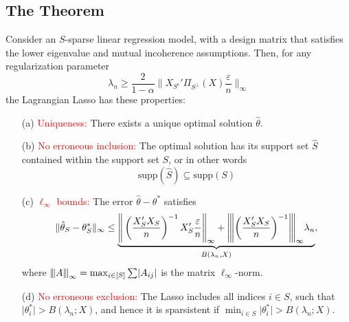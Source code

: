 \documentclass[10pt,handout,english]{beamer}
\newcommand{\vertiii}[1]{{\left\vert\kern-0.25ex\left\vert\kern-0.25ex\left\vert #1 
    \right\vert\kern-0.25ex\right\vert\kern-0.25ex\right\vert}}
\begin{document}
\subsection{The Theorem}

\begin{frame}[allowframebreaks]
\begin{theorem}[Part I]
Consider an $S$-sparse linear regression model, with a design matrix that satisfies the lower eigenvalue and mutual incoherence assumptions. Then, for any regularization parameter\justifying
\[
\lambda_n\geq\frac{2}{1-\alpha}\Bigg\lVert X_{S^c}'\Pi_{S^{\perp}}(X)\frac{\varepsilon}{n}\Bigg\rVert_{\infty}
\]
the Lagrangian Lasso has these properties:
\begin{itemize}
\item[(a)] \textcolor{red}{Uniqueness:} There exists a unique optimal solution $\hat{\theta}$.\justifying
\item[(b)] \textcolor{red}{No erroneous inclusion:} The optimal solution has its support set $\hat{S}$ contained within the support set $S$, or in other words\justifying
\[
\text{supp}(\hat{S})\subseteq \text{supp}(S) 
\]
\end{itemize}
\end{theorem}
\end{frame}


\begin{frame}

\begin{theorem}[Part II]
\begin{itemize}
\item[(c)] \textcolor{red}{$\ell_{\infty}$ bounds:} The error $\hat{\theta}-\theta^*$ satisfies
\[
\lVert\hat{\theta}_S-\theta_S^*\rVert_{\infty}\leq\underbrace{\Bigg\lVert\left(\frac{X_S'X_S}{n}\right)^{-1}X_S'\frac{\varepsilon}{n}\Bigg\rVert_{\infty} +\vertiii{\left(\frac{X_S'X_S}{n}\right)^{-1}}_{\infty}\lambda_n}_{B(\lambda_n,X)},
\]
where $\vertiii{A}_{\infty}=\max_{i\in[S]}\sum\lvert A_{ij}\rvert$ is the matrix $\ell_{\infty}$-norm.
\item[(d)] \textcolor{red}{No erroneous exclusion:} The Lasso includes all indices $i\in S$, such that $\lvert\theta_i^*\rvert>B(\lambda_n;X)$, and hence it is sparsistent if $\min_{i\in S}\lvert\theta_i^*\rvert>B(\lambda_n;X)$.\justifying
\end{itemize}
\end{theorem}
\end{frame}
\end{document}

